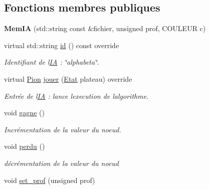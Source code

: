 \subsection*{Fonctions membres publiques}
\begin{DoxyCompactItemize}
\item 
{\bfseries Mem\+IA} (std\+::string const \&fichier, unsigned prof, C\+O\+U\+L\+E\+UR c)\hypertarget{classMemIA_a2c0eed85d2e17e428b62fb4ba23cde1c}{}\label{classMemIA_a2c0eed85d2e17e428b62fb4ba23cde1c}

\item 
virtual std\+::string \hyperlink{classMemIA_a1075fe7a51c71bca7fd6b3cd63d3271d}{id} () const override\hypertarget{classMemIA_a1075fe7a51c71bca7fd6b3cd63d3271d}{}\label{classMemIA_a1075fe7a51c71bca7fd6b3cd63d3271d}

\begin{DoxyCompactList}\small\item\em Identifiant de l\textquotesingle{}\hyperlink{classIA}{IA} \+: \char`\"{}alphabeta\char`\"{}. \end{DoxyCompactList}\item 
virtual \hyperlink{structPion}{Pion} \hyperlink{classMemIA_a82b883399e9d663c382994190572c0a6}{jouer} (\hyperlink{structEtat}{Etat} plateau) override\hypertarget{classMemIA_a82b883399e9d663c382994190572c0a6}{}\label{classMemIA_a82b883399e9d663c382994190572c0a6}

\begin{DoxyCompactList}\small\item\em Entrée de l\textquotesingle{}\hyperlink{classIA}{IA} \+: lance l\textquotesingle{}execution de l\textquotesingle{}algorithme. \end{DoxyCompactList}\item 
void \hyperlink{classMemIA_a5c2b4334f3830d2659d4b25d174aa563}{gagne} ()\hypertarget{classMemIA_a5c2b4334f3830d2659d4b25d174aa563}{}\label{classMemIA_a5c2b4334f3830d2659d4b25d174aa563}

\begin{DoxyCompactList}\small\item\em Incrémentation de la valeur du noeud. \end{DoxyCompactList}\item 
void \hyperlink{classMemIA_a1aba65e04d27d75f0dee1f53d9f20025}{perdu} ()\hypertarget{classMemIA_a1aba65e04d27d75f0dee1f53d9f20025}{}\label{classMemIA_a1aba65e04d27d75f0dee1f53d9f20025}

\begin{DoxyCompactList}\small\item\em décrémentation de la valeur du noeud \end{DoxyCompactList}\item 
void \hyperlink{classMemIA_a533276bc61af601452e9b1c29953371d}{set\+\_\+prof} (unsigned prof)\hypertarget{classMemIA_a533276bc61af601452e9b1c29953371d}{}\label{classMemIA_a533276bc61af601452e9b1c29953371d}


\end{DoxyCompactItemize}
